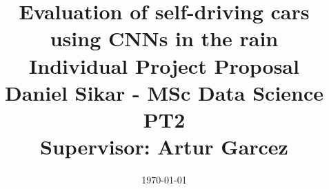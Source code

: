 \documentclass[a4paper,12pt]{article} %
\begin{document}
\title{%
  Evaluation of self-driving cars using CNNs in the rain \\
  \medskip
  \large Individual Project Proposal\\
    Daniel Sikar - MSc Data Science PT2\\
    Supervisor: Artur Garcez 
    }
\date{\today} %

\maketitle %























\pagebreak
\printbibliography
\pagebreak



% 
\end{document}
